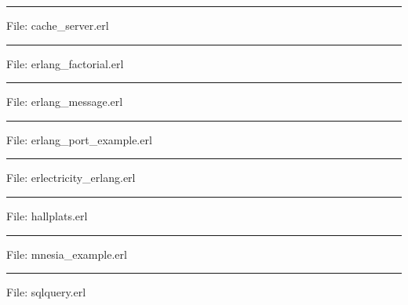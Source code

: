 \noindent
\rule{2cm}{0.5pt} File: cache\_server.erl \hrulefill


\noindent
\rule{2cm}{0.5pt} File: erlang\_factorial.erl \hrulefill


\noindent
\rule{2cm}{0.5pt} File: erlang\_message.erl \hrulefill


\noindent
\rule{2cm}{0.5pt} File: erlang\_port\_example.erl \hrulefill


\noindent
\rule{2cm}{0.5pt} File: erlectricity\_erlang.erl \hrulefill


\noindent
\rule{2cm}{0.5pt} File: hallplats.erl \hrulefill


\noindent
\rule{2cm}{0.5pt} File: mnesia\_example.erl \hrulefill


\noindent
\rule{2cm}{0.5pt} File: sqlquery.erl \hrulefill


